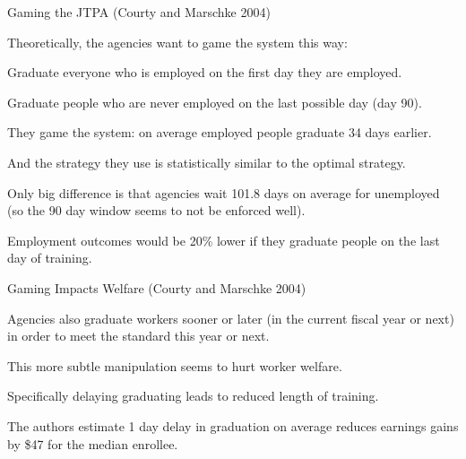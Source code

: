 \documentclass[aspectratio=169,usenames,dvipsnames]{beamer}
\newenvironment{wideitemize}{\itemize\addtolength{\itemsep}{10pt}}{\enditemize}
\begin{document}
\begin{frame}{Gaming the JTPA (Courty and Marschke 2004)}
\begin{wideitemize}
    \item Theoretically, the agencies want to game the system this way:
    \begin{wideitemize}
    \item Graduate everyone who is employed on the first day they are employed.
    \item Graduate people who are never employed on the last possible day (day 90).
\end{wideitemize}\pause
\item They game the system: on average employed people graduate 34 days earlier.
\item And the strategy they use is statistically similar to the optimal strategy.
\item Only big difference is that agencies wait 101.8 days on average for unemployed (so the 90 day window seems to not be enforced well).
\item Employment outcomes would be 20\% lower if they graduate people on the last day of training.
\end{wideitemize}

\end{frame}

\begin{frame}{Gaming Impacts Welfare (Courty and Marschke 2004)}
\begin{wideitemize}
    \item Agencies also graduate workers sooner or later (in the current fiscal year or next) in order to meet the standard this year or next.
    \item This more subtle manipulation seems to hurt worker welfare.
    \item Specifically delaying graduating leads to reduced length of training.
    \item The authors estimate 1 day delay in graduation on average reduces earnings gains by \$47 for the median enrollee.
\end{wideitemize}

\end{frame}
\end{document}
